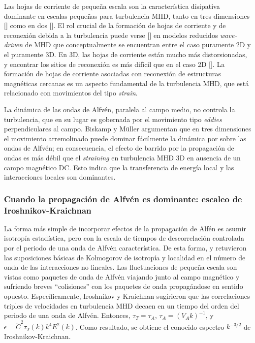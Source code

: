 Las hojas de corriente de pequeña escala son la característica
disipativa dominante en escalas pequeñas para turbulencia MHD, tanto
en tres dimensiones [\cite{biskamp_scaling_2000}] como en dos
[\cite{matthaeus_turbulent_1986}]. El rol crucial de la formación de
hojas de corriente y de reconexión debida a la turbulencia puede verse
[\cite{dmitruk_coronal_2002}] en modelos reducidos
\textit{wave-driven} de MHD que conceptualmente se encuentran entre el caso
puramente 2D y el puramente 3D. En 3D, las hojas de corriente están
mucho más distorsionadas, y encontrar los sitios de reconexión es más
difícil que en el caso 2D [\cite{politano_current_1995}]. La formación
de hojas de corriente asociadas con reconexión de estructuras
magnéticas cercanas es un aspecto fundamental de la turbulencia MHD,
que está relacionado con movimientos del tipo \textit{strain}.

La dinámica de las ondas de Alfvén, paralela al campo medio, no
controla la turbulencia, que en su lugar es gobernada por el
movimiento tipo \textit{eddies} perpendiculares al campo. Biskamp y
M\"uller argumentan que en tres dimensiones el movimiento arremolinado
puede dominar fácilmente la dinámica por sobre las ondas de Alfv\'en;
en consecuencia, el efecto de barrido por la propagación de ondas es
más débil que el \textit{straining} en turbulencia MHD 3D en ausencia
de un campo magnético DC. Esto indica que la transferencia de energía
local y las interacciones locales son dominantes.

\subsubsection{Cuando la propagación de Alfv\'en es dominante: escaleo de Iroshnikov-Kraichnan}\label{sec:escaleoI-K}

La forma más simple de incorporar efectos de la propagación de Alf\'en
es asumir isotropía estadística, pero con la escala de tiempos de
descorrelación controlada por el periodo de una onda de Alfv\'en
característica.  De esta forma, \cite{iroshnikov_turbulence_1964} y
\cite{kraichnan_inertial-range_1965} retuvieron las suposiciones
básicas de Kolmogorov de isotropía y localidad en el número de onda de
las interacciones no lineales. Las fluctuaciones de pequeña escala son
vistas como paquetes de onda de Alfv\'en viajando junto al campo
magnético y sufriendo breves ``colisiones'' con los paquetes de onda
propagándose en sentido opuesto. Específicamente, Iroshnikov y
Kraichnan sugirieron que las correlaciones triples de velocidades en
turbulencia MHD decaen en un tiempo del orden del periodo de una onda
de Alfv\'en. Entonces, $\tau_T = \tau_A$, $\tau_A = (V_A k)^{-1}$, y
$\epsilon = \tilde{C}^2 \tau_T(k) k^4 E^2(k)$. Como resultado, se
obtiene el conocido espectro $k^{-3/2}$ de Iroshnikov-Kraichnan.

